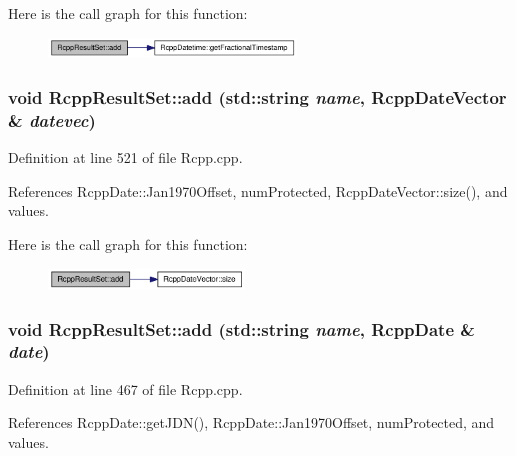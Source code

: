 Here is the call graph for this function:\nopagebreak
\begin{figure}[H]
\begin{center}
\leavevmode
\includegraphics[width=187pt]{classRcppResultSet_1d921e7a24e50369ae67a1bc63826131_cgraph}
\end{center}
\end{figure}
\hypertarget{classRcppResultSet_d7efd746596959ce68ca98c690a2f645}{
\subsubsection[{add}]{\setlength{\rightskip}{0pt plus 5cm}void RcppResultSet::add (std::string {\em name}, \/  {\bf RcppDateVector} \& {\em datevec})}}
\label{classRcppResultSet_d7efd746596959ce68ca98c690a2f645}




Definition at line 521 of file Rcpp.cpp.

References RcppDate::Jan1970Offset, numProtected, RcppDateVector::size(), and values.

Here is the call graph for this function:\nopagebreak
\begin{figure}[H]
\begin{center}
\leavevmode
\includegraphics[width=148pt]{classRcppResultSet_d7efd746596959ce68ca98c690a2f645_cgraph}
\end{center}
\end{figure}
\hypertarget{classRcppResultSet_e5cb861a0d6e95cc7ed465ccae2ac4a7}{
\subsubsection[{add}]{\setlength{\rightskip}{0pt plus 5cm}void RcppResultSet::add (std::string {\em name}, \/  {\bf RcppDate} \& {\em date})}}
\label{classRcppResultSet_e5cb861a0d6e95cc7ed465ccae2ac4a7}




Definition at line 467 of file Rcpp.cpp.

References RcppDate::getJDN(), RcppDate::Jan1970Offset, numProtected, and values.

